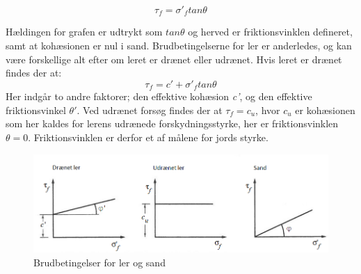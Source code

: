 \begin{equation}
\tau_f = \sigma'_f tan\theta
\end{equation}

Hældingen for grafen er udtrykt som $tan\theta$ og herved er friktionsvinklen defineret, samt at kohæsionen er nul i sand. 
\newline \indent{     }  Brudbetingelserne for ler er anderledes, og kan være forskellige alt efter om leret er drænet eller udrænet. Hvis leret er drænet findes der at: 
\begin{equation}
\tau_f = c' + \sigma'_f tan\theta
\end{equation}
Her indgår to andre faktorer; den effektive kohæsion \textit{c'}, og den effektive friktionsvinkel $\theta'$. Ved udrænet forsøg findes der at $\tau_f=c_u$, hvor $c_u$ er kohæsionen som her kaldes for lerens udrænede forskydningsstyrke, her er friktionsvinklen $\theta = 0$\citep{geoteknik}.  
\newline \indent{     }  Friktionsvinklen er derfor et af målene for jords styrke. 

\begin{figure}[htbp]
	\centering
	\includegraphics[width=1.0\textwidth]{billeder/friktionsvinkeller.png}
	\caption{Brudbetingelser for ler og sand \citep{geoteknik}}
	\label{fig:friktionsvinkler}
\end{figure}


